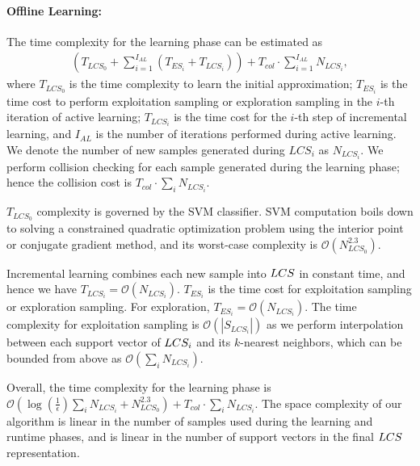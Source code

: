 \paragraph{Offline Learning:} The time complexity for the learning
phase can be estimated as
\begin{align} \label{eq:2:cost}
(T_{LCS_0} + \sum_{i=1}^{I_{AL}} (T_{ES_i} + T_{LCS_i})) + T_{col} \cdot \sum_{i=1}^{I_{AL}} N_{LCS_i},
\end{align}
where $T_{LCS_0}$ is the time complexity to learn the initial approximation;
$T_{ES_i}$ is the time cost to perform exploitation sampling or
exploration sampling in the $i$-th iteration of active learning;
$T_{LCS_i}$ is the time cost for the $i$-th step of incremental
learning, and $I_{AL}$ is the number of iterations performed during active
learning. We denote the number of new samples generated
during $LCS_i$ as $N_{LCS_i}$. We perform collision checking for each sample generated during the learning phase; hence the collision cost is
$T_{col} \cdot \sum_i N_{LCS_i}$.

$T_{LCS_0}$ complexity is governed by the SVM classifier. SVM computation boils down
to solving a constrained quadratic optimization problem using the interior
point or conjugate gradient method, and its worst-case complexity
is $\mathcal O(N_{LCS_0}^{2.3})$.

Incremental learning combines each new sample into $LCS$ in
constant time, and hence we have $T_{LCS_i} = \mathcal
O(N_{LCS_i})$. $T_{ES_i}$ is the time cost for exploitation sampling
or exploration sampling. For exploration, $T_{ES_i} = \mathcal
O(N_{LCS_i})$. The time complexity for exploitation sampling is
$\mathcal O(|S_{LCS_i}|)$ as we perform interpolation between each
support vector of $LCS_i$ and its $k$-nearest neighbors, which can
be bounded from above as $\mathcal O(\sum_i N_{LCS_i})$.

Overall, the time complexity for the learning phase is
$\mathcal O(\log(\frac{1}{\epsilon}) \sum_i{N_{LCS_i}} +
N_{LCS_0}^{2.3}) + T_{col} \cdot \sum_i N_{LCS_i}$.
The space complexity of our algorithm is linear in the
number of samples used during the learning and runtime phases, and is linear in the number of support vectors in the final $LCS$ representation.

